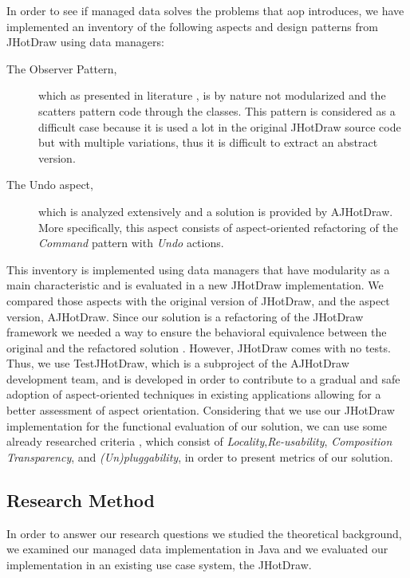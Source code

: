In order to see if managed data solves the problems that \ac{aop} introduces, we have implemented an inventory of the following aspects and design patterns from JHotDraw using data managers:
\begin{description}

  \item[The Observer Pattern,] which as presented in literature \cite{tourwe2003existence} \cite{hannemann2005role} \cite{marin2005approach}, is by nature not modularized and the scatters pattern code through the classes. 
  This pattern is considered as a difficult case because it is used a lot in the original JHotDraw source code but with multiple variations, thus it is difficult to extract an abstract version.

  \item[The Undo aspect,] which is analyzed extensively \cite{marin2004refactoring} and a solution is provided by AJHotDraw. 
  More specifically, this aspect consists of aspect-oriented refactoring of the \textit{Command} pattern with \textit{Undo} actions.

\end{description}
This inventory is implemented using data managers that have modularity as a main characteristic and is evaluated in a new JHotDraw implementation.
We compared those aspects with the original version of JHotDraw, and the aspect version, AJHotDraw. 
Since our solution is a refactoring of the JHotDraw framework we needed a way to ensure the behavioral equivalence between the original and the refactored solution \cite{fowler2009refactoring}. However, JHotDraw comes with no tests. 
Thus, we use TestJHotDraw, which is a subproject of the AJHotDraw development team, and is developed in order to contribute to a gradual and safe adoption of aspect-oriented techniques in existing applications allowing for a better assessment of aspect orientation.
Considering that we use our JHotDraw implementation for the functional evaluation of our solution, we can use some already researched criteria \cite{hannemann2002design}, which consist of \textit{Locality},\textit{Re-usability}, \textit{Composition Transparency}, and \textit{(Un)pluggability}, in order to present metrics of our solution. 

\subsection{Research Method}\label{Research Method}
In order to answer our research questions we studied the theoretical background, we examined our managed data implementation in Java and we evaluated our implementation in an existing use case system, the JHotDraw.

